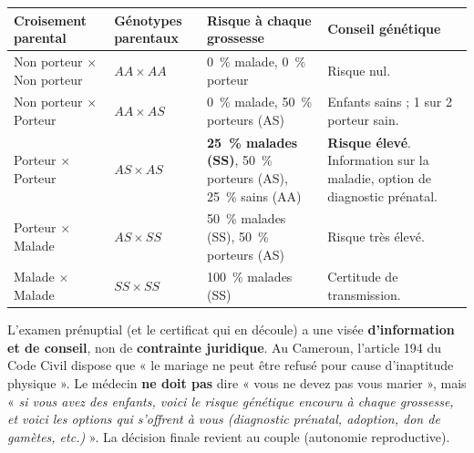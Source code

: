 \documentclass[11pt]{article}
\begin{document}
\begin{center}
\begin{tabularx}{\linewidth}{|l|X|X|X|}\hline
\rowcolor{popblueL}
\textbf{Croisement parental} & \textbf{Génotypes parentaux} & \textbf{Risque à chaque grossesse} & \textbf{Conseil génétique} \\ \hline
Non porteur $\times$ Non porteur & $AA \times AA$ & \SI{0}{\%} malade, \SI{0}{\%} porteur & Risque nul. \\ \hline
Non porteur $\times$ Porteur & $AA \times AS$ & \SI{0}{\%} malade, \SI{50}{\%} porteurs (AS) & Enfants sains ; 1 sur 2 porteur sain. \\ \hline
Porteur $\times$ Porteur & $AS \times AS$ & \textbf{\SI{25}{\%} malades (SS)}, \SI{50}{\%} porteurs (AS), \SI{25}{\%} sains (AA) & \textbf{Risque élevé}. Information sur la maladie, option de diagnostic prénatal. \\ \hline
Porteur $\times$ Malade & $AS \times SS$ & \SI{50}{\%} malades (SS), \SI{50}{\%} porteurs (AS) & Risque très élevé. \\ \hline
Malade $\times$ Malade & $SS \times SS$ & \SI{100}{\%} malades (SS) & Certitude de transmission. \\ \hline
\end{tabularx}
\end{center}

\begin{attention}
L'examen prénuptial (et le certificat qui en découle) a une visée \textbf{d'information et de conseil}, non de \textbf{contrainte juridique}. Au Cameroun, l'article 194 du Code Civil dispose que « le mariage ne peut être refusé pour cause d'inaptitude physique ». Le médecin \textbf{ne doit pas} dire « vous ne devez pas vous marier », mais « \emph{si vous avez des enfants, voici le risque génétique encouru à chaque grossesse, et voici les options qui s'offrent à vous (diagnostic prénatal, adoption, don de gamètes, etc.)} ». La décision finale revient au couple (autonomie reproductive).
\end{attention}
\end{document}
